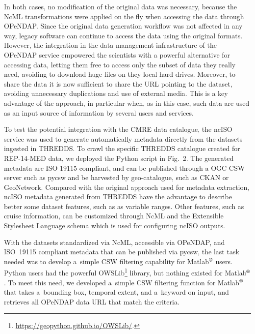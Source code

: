 \documentclass[osd, online, hvmath]{copernicus}
\begin{document}
In both cases, no modification of the original data was necessary, because the NcML transformations were applied on the fly when accessing the data through OPeNDAP. Since the original data generation workflow was not affected in any way, legacy software can continue to access the data using the original formats. However, the integration in the data management infrastructure of the OPeNDAP service empowered the scientists with a powerful alternative for accessing data, letting them free to access only the subset of data they really need, avoiding to download huge files on they local hard drives. Moreover, to share the data it is now sufficient to share the URL pointing to the dataset, avoiding unnecessary duplications and use of external media. This is a key advantage of the approach, in particular when, as in this case, such data are used as an input source of information by several users and services.

To test the potential integration with the CMRE data catalogue, the ncISO service was used to generate automatically metadata directly from the datasets ingested in THREDDS. To crawl the specific THREDDS catalogue created for REP-14-MED data, we deployed the Python script in Fig.~2. The generated metadata are ISO 19115 compliant, and can be published through a OGC CSW server such as pycsw and be harvested by geo-catalogue, such as CKAN or GeoNetwork. 
Compared with the original approach used for metadata extraction, ncISO metadata generated from THREDDS have the advantage to describe better some dataset features, such as as variable ranges. Other features, such as cruise information, can be customized through NcML and the Extensible Stylesheet Language schema which is used for configuring ncISO outputs. 

With the datasets standardized via NcML, accessible via OPeNDAP, and ISO~19115 compliant metadata that can be published via pycsw, the
last task needed was to develop a~simple CSW filtering capability for Matlab$^{\text{\textregistered}}$ users. Python users had the powerful
OWSLib\footnote{\url{https://geopython.github.io/OWSLib/}.} library, but nothing existed for Matlab$^{\text{\textregistered}}$. To meet
this need, we developed a~simple CSW filtering function for Matlab$^{\text{\textregistered}}$ that takes a~bounding box, temporal extent, and a~keyword on input, and retrieves all OPeNDAP data URL that match the criteria.
\end{document}
